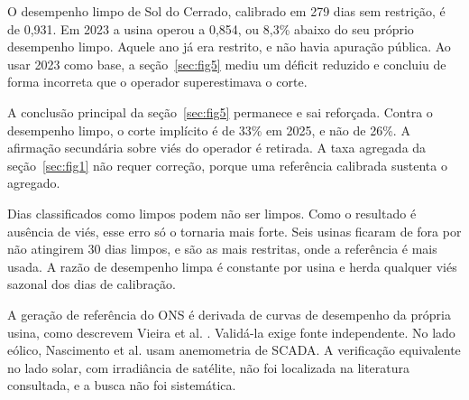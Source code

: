  O desempenho limpo de Sol do Cerrado, calibrado em 279 dias
sem restrição, é de 0,931. Em 2023 a usina operou a 0,854, ou 8,3\% abaixo do
seu próprio desempenho limpo. Aquele ano já era restrito, e não havia apuração
pública. Ao usar 2023 como base, a seção~\ref{sec:fig5} mediu um déficit
reduzido e concluiu de forma incorreta que o operador superestimava o corte.

 A conclusão principal da
seção~\ref{sec:fig5} permanece e sai reforçada. Contra o desempenho limpo, o
corte implícito é de 33\% em 2025, e não de 26\%. A afirmação secundária sobre
viés do operador é retirada. A taxa agregada da seção~\ref{sec:fig1} não requer
correção, porque uma referência calibrada sustenta o agregado.

\begin{objecao}
Dias classificados como limpos podem não ser limpos. Como o resultado é ausência
de viés, esse erro só o tornaria mais forte. Seis usinas ficaram de fora por não
atingirem 30 dias limpos, e são as mais restritas, onde a referência é mais
usada. A razão de desempenho limpa é constante por usina e herda qualquer viés
sazonal dos dias de calibração.
\end{objecao}

 A geração de referência do ONS é derivada de
curvas de desempenho da própria usina, como descrevem Vieira et al.
\cite{vieira2026}. Validá-la exige fonte independente. No lado eólico, Nascimento
et al. \cite{silva2026} usam anemometria de SCADA. A verificação equivalente no
lado solar, com irradiância de satélite, não foi localizada na literatura
consultada, e a busca não foi sistemática.
